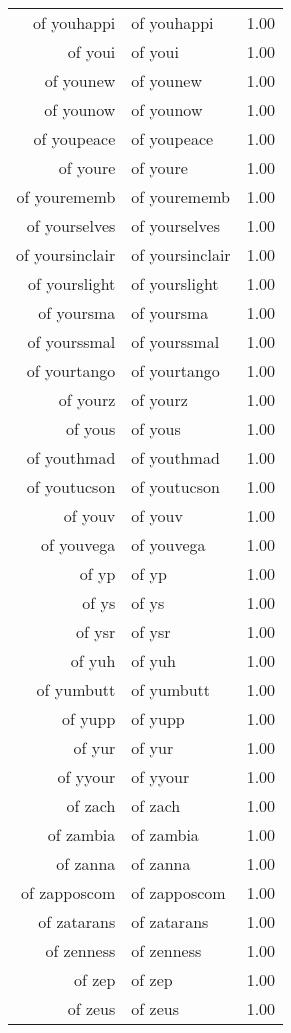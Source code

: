 \begin{table}[ht]
\begin{tabular}{rlr}
  of youhappi & of youhappi & 1.00 \\ 
  of youi & of youi & 1.00 \\ 
  of younew & of younew & 1.00 \\ 
  of younow & of younow & 1.00 \\ 
  of youpeace & of youpeace & 1.00 \\ 
  of youre & of youre & 1.00 \\ 
  of yourememb & of yourememb & 1.00 \\ 
  of yourselves & of yourselves & 1.00 \\ 
  of yoursinclair & of yoursinclair & 1.00 \\ 
  of yourslight & of yourslight & 1.00 \\ 
  of yoursma & of yoursma & 1.00 \\ 
  of yourssmal & of yourssmal & 1.00 \\ 
  of yourtango & of yourtango & 1.00 \\ 
  of yourz & of yourz & 1.00 \\ 
  of yous & of yous & 1.00 \\ 
  of youthmad & of youthmad & 1.00 \\ 
  of youtucson & of youtucson & 1.00 \\ 
  of youv & of youv & 1.00 \\ 
  of youvega & of youvega & 1.00 \\ 
  of yp & of yp & 1.00 \\ 
  of ys & of ys & 1.00 \\ 
  of ysr & of ysr & 1.00 \\ 
  of yuh & of yuh & 1.00 \\ 
  of yumbutt & of yumbutt & 1.00 \\ 
  of yupp & of yupp & 1.00 \\ 
  of yur & of yur & 1.00 \\ 
  of yyour & of yyour & 1.00 \\ 
  of zach & of zach & 1.00 \\ 
  of zambia & of zambia & 1.00 \\ 
  of zanna & of zanna & 1.00 \\ 
  of zapposcom & of zapposcom & 1.00 \\ 
  of zatarans & of zatarans & 1.00 \\ 
  of zenness & of zenness & 1.00 \\ 
  of zep & of zep & 1.00 \\ 
  of zeus & of zeus & 1.00 \\ 

\end{tabular}
\end{table}
